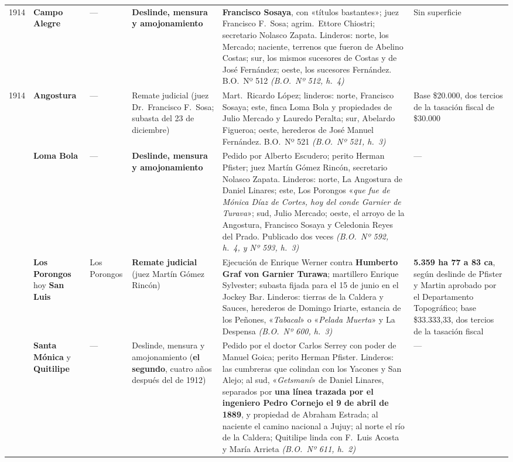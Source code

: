 {\begin{longtable}{@{}p{0.8cm}p{2.4cm}p{1.6cm}p{2.1cm}p{2.9cm}p{2.1cm}@{}}
1914 & \textbf{Campo Alegre} & --- & \textbf{Deslinde, mensura y amojonamiento} & \textbf{Francisco Sosaya}, con «títulos bastantes»; juez Francisco F.\ Sosa; agrim.\ Ettore Chiostri; secretario Nolasco Zapata. Linderos: norte, los Mercado; naciente, terrenos que fueron de Abelino Costas; sur, los mismos sucesores de Costas y de José Fernández; oeste, los sucesores Fernández. B.O.\ Nº 512 \textit{(B.O.\ Nº 512, h.\ 4)}& Sin superficie \\
\addlinespace

1914 & \textbf{Angostura} & --- & Remate judicial (juez Dr.\ Francisco F.\ Sosa; subasta del 23 de diciembre) & Mart.\ Ricardo López; linderos: norte, Francisco Sosaya; este, finca Loma Bola y propiedades de Julio Mercado y Lauredo Peralta; sur, Abelardo Figueroa; oeste, herederos de José Manuel Fernández. B.O.\ Nº 521 \textit{(B.O.\ Nº 521, h.\ 3)}& Base \$20.000, dos tercios de la tasación fiscal de \$30.000 \\
\addlinespace
1916 & \textbf{Loma Bola} & --- & \textbf{Deslinde, mensura y amojonamiento} & Pedido por Alberto Escudero; perito Herman Pfister\index{Pfister, Hermann}; juez Martín Gómez Rincón, secretario Nolasco Zapata. Linderos: norte, La Angostura de Daniel Linares\index{Linares, Daniel}; este, Los Porongos «\textit{que fue de Mónica Díaz de Cortes, hoy del conde Garnier de Turava}»; sud, Julio Mercado; oeste, el arroyo de la Angostura, Francisco Sosaya y Celedonia Reyes del Prado. Publicado dos veces \textit{(B.O.\ Nº 592, h.\ 4, y Nº 593, h.\ 3)}& --- \\
\addlinespace
1916 & \textbf{Los Porongos} hoy \textbf{San Luis} & Los Porongos & \textbf{Remate judicial} (juez Martín Gómez Rincón) & Ejecución de Enrique Werner contra \textbf{Humberto Graf von Garnier Turawa}; martillero Enrique Sylvester; subasta fijada para el 15 de junio en el Jockey Bar. Linderos: tierras de la Caldera y Sauces, herederos de Domingo Iriarte, estancia de los Peñones, «\textit{Tabacal}» o «\textit{Pelada Muerta}» y La Despensa \textit{(B.O.\ Nº 600, h.\ 3)}& \textbf{5.359 ha 77 a 83 ca}, según deslinde de Pfister y Martin aprobado por el Departamento Topográfico; base \$33.333,33, dos tercios de la tasación fiscal \\
\addlinespace
1916 & \textbf{Santa Mónica} y \textbf{Quitilipe} & --- & Deslinde, mensura y amojonamiento (\textbf{el segundo}, cuatro años después del de 1912) & Pedido por el doctor Carlos Serrey con poder de Manuel Goica; perito Herman Pfister\index{Pfister, Hermann}. Linderos: las cumbreras que colindan con los Yacones y San Alejo; al sud, «\textit{Getsmaní}» de Daniel Linares\index{Linares, Daniel}, separados por \textbf{una línea trazada por el ingeniero Pedro Cornejo el 9 de abril de 1889}, y propiedad de Abraham Estrada; al naciente el camino nacional a Jujuy; al norte el río de la Caldera; Quitilipe linda con F.\ Luis Acosta y María Arrieta \textit{(B.O.\ Nº 611, h.\ 2)}& --- \\

\end{longtable}}
